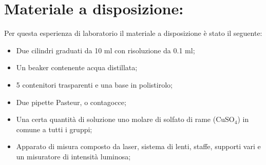 \vspace{-0.3cm}

\section{Materiale a disposizione:}

Per questa esperienza di laboratorio il materiale a disposizione è stato il seguente:
\begin{itemize} \itemsep2pt \parskip0pt 
	\item{Due cilindri graduati da 10 $\si{\milli\litre}$ con risoluzione da 0.1 $\si{\milli\litre}$;}
    \item{Un beaker contenente acqua distillata;}
	\item{5 contenitori trasparenti e una base in polistirolo;}
	\item{Due pipette Pasteur, o contagocce;}
	\item{Una certa quantità di soluzione uno molare di solfato di rame (CuSO$_4$) in comune a tutti i gruppi;}
	\item{Apparato di misura composto da laser, sistema di lenti, staffe, supporti vari e un misuratore di intensità luminosa;}
\end{itemize}
